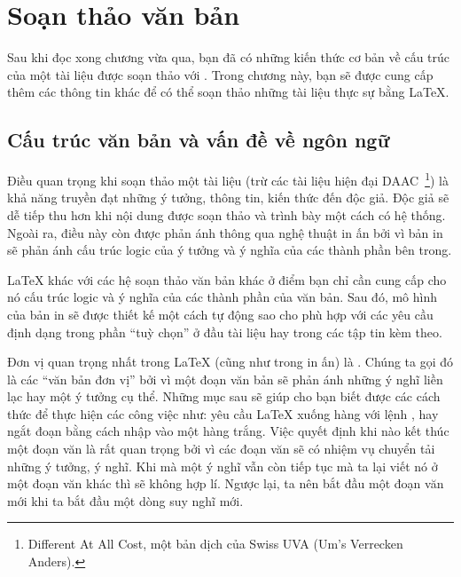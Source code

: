 
\chapter{Soạn thảo văn bản}

\begin{intro}
Sau khi đọc xong chương vừa qua, bạn đã có những kiến thức cơ bản về cấu trúc của một tài liệu được soạn thảo với \LaTeXe{}. Trong chương này, bạn sẽ được cung cấp thêm các thông tin khác để có thể soạn thảo những tài liệu thực sự bằng \LaTeX{}.
\end{intro}

\section{Cấu trúc văn bản và vấn đề về ngôn ngữ}
Điều quan trọng khi soạn thảo một tài liệu (trừ các tài liệu hiện đại DAAC~\footnote{Different At All Cost, một bản dịch của Swiss UVA (Um's Verrecken Anders).}) là khả năng truyền đạt những ý tưởng, thông tin, kiến thức đến độc giả. Độc giả sẽ dễ tiếp thu hơn khi nội dung được soạn thảo và trình bày một cách có hệ thống. Ngoài ra, điều này còn được phản ánh thông qua nghệ thuật in ấn bởi vì bản in sẽ phản ánh cấu trúc logic của ý tưởng và ý nghĩa của các thành phần bên trong.

\LaTeX{} khác với các hệ soạn thảo văn bản khác ở điểm bạn chỉ cần cung cấp cho nó cấu trúc logic và ý nghĩa của các thành phần của văn bản. Sau đó, mô hình của bản in sẽ được thiết kế một cách tự động sao cho phù hợp với các yêu cầu định dạng trong phần ``tuỳ chọn'' ở đầu tài liệu hay trong các tập tin kèm theo.

Đơn vị quan trọng nhất trong \LaTeX{} (cũng như trong in ấn) là . Chúng ta gọi đó là các ``văn bản đơn vị'' bởi vì một đoạn văn bản sẽ phản ánh những ý nghĩ liền lạc hay một ý tưởng cụ thể. Những mục sau sẽ giúp cho bạn biết được các cách thức để thực hiện các công việc như: yêu cầu \LaTeX{} xuống hàng với lệnh \texttt{\bs\bs}, hay ngắt đoạn bằng cách nhập vào một hàng trắng. Việc quyết định khi nào kết thúc một đoạn văn là rất quan trọng bởi vì các đoạn văn sẽ có nhiệm vụ chuyển tải những ý tưởng, ý nghĩ. Khi mà một ý nghĩ vẫn còn tiếp tục mà ta lại viết nó ở một đoạn văn khác thì sẽ không hợp lí. Ngược lại, ta nên bắt đầu một đoạn văn mới khi ta bắt đầu một dòng suy nghĩ mới.

